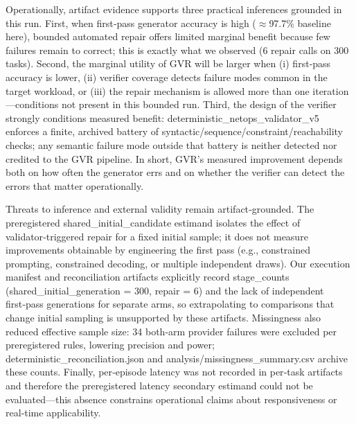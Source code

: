 \documentclass[conference]{IEEEtran}
\begin{document}
Operationally, artifact evidence supports three practical inferences grounded in this run. First, when first‑pass generator accuracy is high (\ensuremath{\approx}97.7\% baseline here), bounded automated repair offers limited marginal benefit because few failures remain to correct; this is exactly what we observed (6 repair calls on 300 tasks). Second, the marginal utility of GVR will be larger when (i) first‑pass accuracy is lower, (ii) verifier coverage detects failure modes common in the target workload, or (iii) the repair mechanism is allowed more than one iteration---conditions not present in this bounded run. Third, the design of the verifier strongly conditions measured benefit: deterministic\_netops\_validator\_v5 enforces a finite, archived battery of syntactic/sequence/constraint/reachability checks; any semantic failure mode outside that battery is neither detected nor credited to the GVR pipeline. In short, GVR's measured improvement depends both on how often the generator errs and on whether the verifier can detect the errors that matter operationally.

Threats to inference and external validity remain artifact‑grounded. The preregistered shared\_initial\_candidate estimand isolates the effect of validator‑triggered repair for a fixed initial sample; it does not measure improvements obtainable by engineering the first pass (e.g., constrained prompting, constrained decoding, or multiple independent draws). Our execution manifest and reconciliation artifacts explicitly record stage\_counts (shared\_initial\_generation = 300, repair = 6) and the lack of independent first‑pass generations for separate arms, so extrapolating to comparisons that change initial sampling is unsupported by these artifacts. Missingness also reduced effective sample size: 34 both‑arm provider failures were excluded per preregistered rules, lowering precision and power; deterministic\_reconciliation.json and analysis/missingness\_summary.csv archive these counts. Finally, per‑episode latency was not recorded in per‑task artifacts and therefore the preregistered latency secondary estimand could not be evaluated---this absence constrains operational claims about responsiveness or real‑time applicability.
\end{document}
